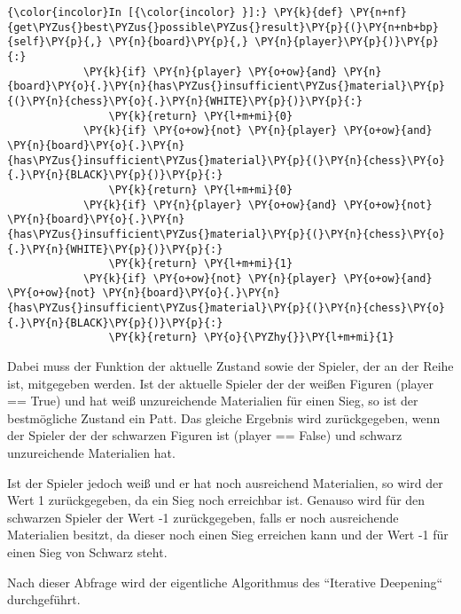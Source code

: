     \begin{Verbatim}[commandchars=\\\{\}]
{\color{incolor}In [{\color{incolor} }]:} \PY{k}{def} \PY{n+nf}{get\PYZus{}best\PYZus{}possible\PYZus{}result}\PY{p}{(}\PY{n+nb+bp}{self}\PY{p}{,} \PY{n}{board}\PY{p}{,} \PY{n}{player}\PY{p}{)}\PY{p}{:}
            \PY{k}{if} \PY{n}{player} \PY{o+ow}{and} \PY{n}{board}\PY{o}{.}\PY{n}{has\PYZus{}insufficient\PYZus{}material}\PY{p}{(}\PY{n}{chess}\PY{o}{.}\PY{n}{WHITE}\PY{p}{)}\PY{p}{:}
                \PY{k}{return} \PY{l+m+mi}{0}
            \PY{k}{if} \PY{o+ow}{not} \PY{n}{player} \PY{o+ow}{and} \PY{n}{board}\PY{o}{.}\PY{n}{has\PYZus{}insufficient\PYZus{}material}\PY{p}{(}\PY{n}{chess}\PY{o}{.}\PY{n}{BLACK}\PY{p}{)}\PY{p}{:}
                \PY{k}{return} \PY{l+m+mi}{0}
            \PY{k}{if} \PY{n}{player} \PY{o+ow}{and} \PY{o+ow}{not} \PY{n}{board}\PY{o}{.}\PY{n}{has\PYZus{}insufficient\PYZus{}material}\PY{p}{(}\PY{n}{chess}\PY{o}{.}\PY{n}{WHITE}\PY{p}{)}\PY{p}{:}
                \PY{k}{return} \PY{l+m+mi}{1}
            \PY{k}{if} \PY{o+ow}{not} \PY{n}{player} \PY{o+ow}{and} \PY{o+ow}{not} \PY{n}{board}\PY{o}{.}\PY{n}{has\PYZus{}insufficient\PYZus{}material}\PY{p}{(}\PY{n}{chess}\PY{o}{.}\PY{n}{BLACK}\PY{p}{)}\PY{p}{:}
                \PY{k}{return} \PY{o}{\PYZhy{}}\PY{l+m+mi}{1}
\end{Verbatim}

    Dabei muss der Funktion der aktuelle Zustand sowie der Spieler, der an
der Reihe ist, mitgegeben werden. Ist der aktuelle Spieler der der
weißen Figuren (player == True) und hat weiß unzureichende Materialien
für einen Sieg, so ist der bestmögliche Zustand ein Patt. Das gleiche
Ergebnis wird zurückgegeben, wenn der Spieler der der schwarzen Figuren
ist (player == False) und schwarz unzureichende Materialien hat.

Ist der Spieler jedoch weiß und er hat noch ausreichend Materialien, so
wird der Wert 1 zurückgegeben, da ein Sieg noch erreichbar ist. Genauso
wird für den schwarzen Spieler der Wert -1 zurückgegeben, falls er noch
ausreichende Materialien besitzt, da dieser noch einen Sieg erreichen
kann und der Wert -1 für einen Sieg von Schwarz steht.

Nach dieser Abfrage wird der eigentliche Algorithmus des ``Iterative
Deepening`` durchgeführt.

